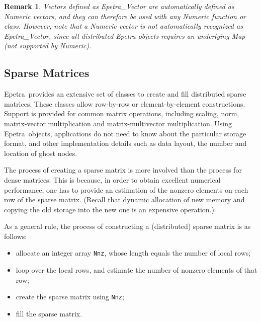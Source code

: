 \documentclass[10pt,relax]{SANDreport}
\newcommand{\epetra}{{Epetra}}
\newtheorem{remark}{Remark}
\begin{document}
\begin{remark}
Vectors defined as Epetra\_Vector are automatically defined as Numeric
vectors, and they can therefore be used with any Numeric function or class.
However, note that a Numeric vector is {\sl not} automatically recognized as
Epetra\_Vector, since all distributed Epetra objects requires an underlying
Map (not supported by Numeric).
\end{remark}

\vspace*{1cm}
\vspace*{1cm}

\subsection{Sparse Matrices}
\label{sec:matrices}

\epetra\ provides an extensive set of classes to create and fill
distributed sparse matrices. These classes allow row-by-row or
element-by-element constructions. Support is provided for common matrix
operations, including scaling, norm, matrix-vector multiplication and
matrix-multivector multiplication.
Using \epetra\ objects, applications do not need to know about the
particular storage format, and other implementation details such as data
layout, the number and location of ghost nodes. 

The process of creating a sparse matrix is more involved than the
process for dense matrices. This is because, in order to obtain
excellent numerical performance, one has to provide an estimation of
the nonzero elements on each row of the sparse matrix. (Recall that
dynamic allocation of new memory and copying the old storage into the
new one is an expensive operation.)

As a general rule, the process of constructing a (distributed) sparse
matrix is as follows:
\begin{itemize}
\item allocate an integer array \verb!Nnz!, whose length equals the
  number of local rows;
\item loop over the local rows, and estimate the number of nonzero
  elements of that row;
\item create the sparse matrix using \verb!Nnz!;
\item fill the sparse matrix.
\end{itemize}
\end{document}
